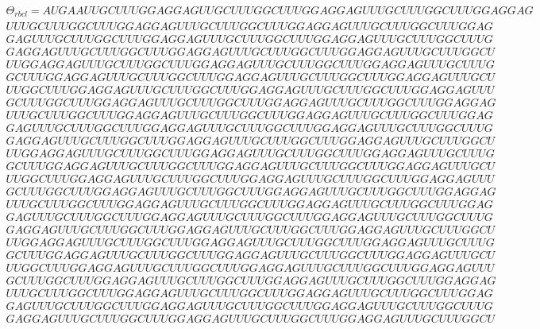 \documentclass[a4paper, 18pt]{book} %
\begin{document}
\small
\begin{multline}
\Theta_{rbcl} = 
AUGAAUUGCUUUGGAGGAGUUGCUUUGGCUUUGGAGGAGUUUGCUUUGGCUUUGGAGGAG\\
UUUGCUUUGGCUUUGGAGGAGUUUGCUUUGGCUUUGGAGGAGUUUGCUUUGGCUUUGGAG\\
GAGUUUGCUUUGGCUUUGGAGGAGUUUGCUUUGGCUUUGGAGGAGUUUGCUUUGGCUUUG\\
GAGGAGUUUGCUUUGGCUUUGGAGGAGUUUGCUUUGGCUUUGGAGGAGUUUGCUUUGGCU\\
UUGGAGGAGUUUGCUUUGGCUUUGGAGGAGUUUGCUUUGGCUUUGGAGGAGUUUGCUUUG\\
GCUUUGGAGGAGUUUGCUUUGGCUUUGGAGGAGUUUGCUUUGGCUUUGGAGGAGUUUGCU\\
UUGGCUUUGGAGGAGUUUGCUUUGGCUUUGGAGGAGUUUGCUUUGGCUUUGGAGGAGUUU\\
GCUUUGGCUUUGGAGGAGUUUGCUUUGGCUUUGGAGGAGUUUGCUUUGGCUUUGGAGGAG\\
UUUGCUUUGGCUUUGGAGGAGUUUGCUUUGGCUUUGGAGGAGUUUGCUUUGGCUUUGGAG\\
GAGUUUGCUUUGGCUUUGGAGGAGUUUGCUUUGGCUUUGGAGGAGUUUGCUUUGGCUUUG\\
GAGGAGUUUGCUUUGGCUUUGGAGGAGUUUGCUUUGGCUUUGGAGGAGUUUGCUUUGGCU\\
UUGGAGGAGUUUGCUUUGGCUUUGGAGGAGUUUGCUUUGGCUUUGGAGGAGUUUGCUUUG\\
GCUUUGGAGGAGUUUGCUUUGGCUUUGGAGGAGUUUGCUUUGGCUUUGGAGGAGUUUGCU\\
UUGGCUUUGGAGGAGUUUGCUUUGGCUUUGGAGGAGUUUGCUUUGGCUUUGGAGGAGUUU\\
GCUUUGGCUUUGGAGGAGUUUGCUUUGGCUUUGGAGGAGUUUGCUUUGGCUUUGGAGGAG\\
UUUGCUUUGGCUUUGGAGGAGUUUGCUUUGGCUUUGGAGGAGUUUGCUUUGGCUUUGGAG\\
GAGUUUGCUUUGGCUUUGGAGGAGUUUGCUUUGGCUUUGGAGGAGUUUGCUUUGGCUUUG\\
GAGGAGUUUGCUUUGGCUUUGGAGGAGUUUGCUUUGGCUUUGGAGGAGUUUGCUUUGGCU\\
UUGGAGGAGUUUGCUUUGGCUUUGGAGGAGUUUGCUUUGGCUUUGGAGGAGUUUGCUUUG\\
GCUUUGGAGGAGUUUGCUUUGGCUUUGGAGGAGUUUGCUUUGGCUUUGGAGGAGUUUGCU\\
UUGGCUUUGGAGGAGUUUGCUUUGGCUUUGGAGGAGUUUGCUUUGGCUUUGGAGGAGUUU\\
GCUUUGGCUUUGGAGGAGUUUGCUUUGGCUUUGGAGGAGUUUGCUUUGGCUUUGGAGGAG\\
UUUGCUUUGGCUUUGGAGGAGUUUGCUUUGGCUUUGGAGGAGUUUGCUUUGGCUUUGGAG\\
GAGUUUGCUUUGGCUUUGGAGGAGUUUGCUUUGGCUUUGGAGGAGUUUGCUUUGGCUUUG\\
GAGGAGUUUGCUUUGGCUUUGGAGGAGUUUGCUUUGGCUUUGGAGGAGUUUGCUUUGGCU\\

\end{multline}
\end{document}
